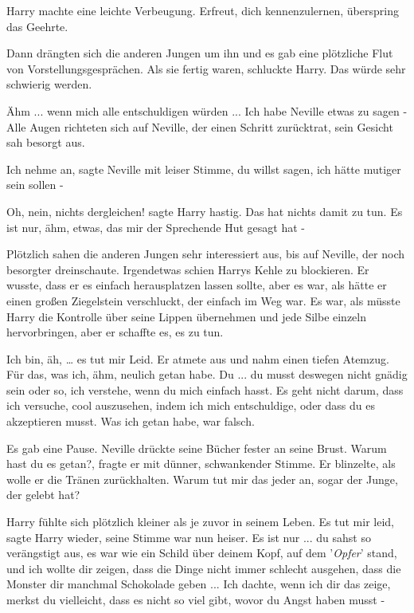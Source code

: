 Harry machte eine leichte Verbeugung. \glqq{}Erfreut, dich kennenzulernen,
überspring das Geehrte.\grqq{}

Dann drängten sich die anderen Jungen um ihn und es gab eine plötzliche Flut von
Vorstellungsgesprächen. Als sie fertig waren, schluckte Harry. Das würde sehr
schwierig werden.

\glqq{}Ähm ... wenn mich alle entschuldigen würden ... Ich habe Neville etwas zu
sagen -\grqq{} Alle Augen richteten sich auf Neville, der einen Schritt
zurücktrat, sein Gesicht sah besorgt aus.

\glqq{}Ich nehme an\grqq{}, sagte Neville mit leiser Stimme, \glqq{}du willst
sagen, ich hätte mutiger sein sollen -\grqq{}

\glqq{}Oh, nein, nichts dergleichen!\grqq{} sagte Harry hastig. \glqq{}Das hat
nichts damit zu tun. Es ist nur, ähm, etwas, das mir der Sprechende Hut gesagt
hat -\grqq{}

Plötzlich sahen die anderen Jungen sehr interessiert aus, bis auf Neville, der
noch besorgter dreinschaute. Irgendetwas schien Harrys Kehle zu blockieren. Er
wusste, dass er es einfach herausplatzen lassen sollte, aber es war, als hätte
er einen großen Ziegelstein verschluckt, der einfach im Weg war. Es war, als
müsste Harry die Kontrolle über seine Lippen übernehmen und jede Silbe einzeln
hervorbringen, aber er schaffte es, es zu tun.

\glqq{}Ich bin, äh, … es tut mir Leid.\grqq{} Er atmete aus und nahm einen tiefen
Atemzug. \glqq{}Für das, was ich, ähm, neulich getan habe. Du ... du musst
deswegen nicht gnädig sein oder so, ich verstehe, wenn du mich einfach hasst. Es
geht nicht darum, dass ich versuche, cool auszusehen, indem ich mich
entschuldige, oder dass du es akzeptieren musst. Was ich getan habe, war
falsch.\grqq{}

Es gab eine Pause. Neville drückte seine Bücher fester an seine Brust. \glqq{}
Warum hast du es getan?\grqq{}, fragte er mit dünner, schwankender Stimme. Er
blinzelte, als wolle er die Tränen zurückhalten. \glqq{}Warum tut mir das jeder
an, sogar der Junge, der gelebt hat?\grqq{}

Harry fühlte sich plötzlich kleiner als je zuvor in seinem Leben. \glqq{}Es tut
mir leid\grqq{}, sagte Harry wieder, seine Stimme war nun heiser. \glqq{}Es ist
nur ... du sahst so verängstigt aus, es war wie ein Schild über deinem Kopf, auf
dem '\emph{Opfer}' stand, und ich wollte dir zeigen, dass die Dinge nicht immer
schlecht ausgehen, dass die Monster dir manchmal Schokolade geben ... Ich dachte,
wenn ich dir das zeige, merkst du vielleicht, dass es nicht so viel gibt, wovor
du Angst haben musst -\grqq{}

